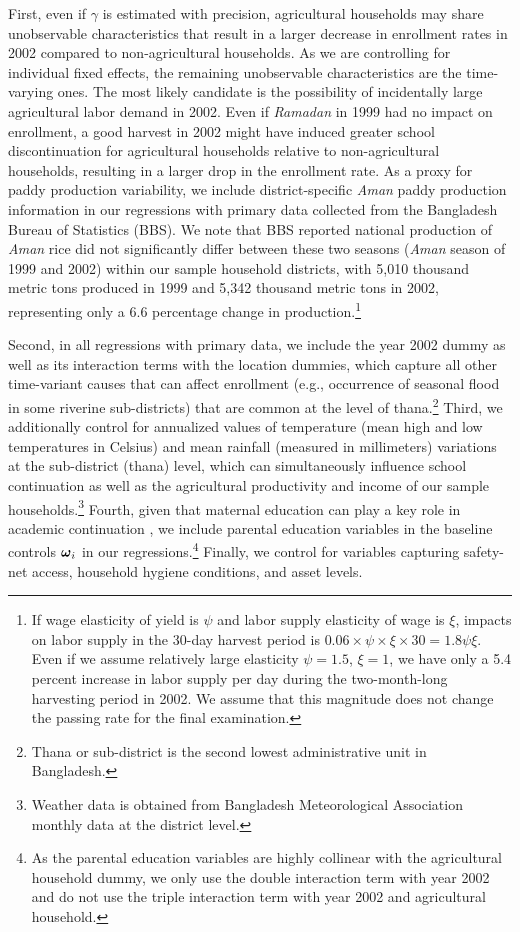 \documentclass[12pt,letterpaper]{article}\usepackage[margin=1in]{geometry}
\newcommand{\bfomega}{\ensuremath{\mbox{\boldmath $\omega$}}}
\newcommand{\0}{\ensuremath{\mbox{\boldmath $0$}}}
\begin{document}
First, even if $\gamma$ is estimated with precision, agricultural households may share unobservable characteristics that result in a larger decrease in enrollment rates in 2002 compared to non-agricultural households. As we are controlling for individual fixed effects, the remaining unobservable characteristics are the time-varying ones. The most likely candidate is the possibility of incidentally large agricultural labor demand in 2002. Even if \textit{Ramadan} in 1999 had no impact on enrollment, a good harvest in 2002 might have induced greater school discontinuation for agricultural households relative to non-agricultural households, resulting in a larger drop in the enrollment rate. As a proxy for paddy production variability, we include district-specific \textit{Aman} paddy production information in our regressions with primary data collected from the Bangladesh Bureau of Statistics (BBS). We note that BBS reported national production of \textit{Aman} rice did not significantly differ between these two seasons (\textit{Aman} season of 1999 and 2002) within our sample household districts, with 5,010 thousand metric tons produced in 1999 and 5,342 thousand metric tons in 2002, representing only a 6.6 percentage change in production.\footnote{If wage elasticity of yield is $\psi$ and labor supply elasticity of wage is $\xi$, impacts on labor supply in the 30-day harvest period is $0.06\times\psi\times\xi\times 30 = 1.8\psi\xi$. Even if we assume relatively large elasticity $\psi = 1.5$, $\xi=1$, we have only a 5.4 percent increase in labor supply per day during the two-month-long harvesting period in 2002. We assume that this magnitude does not change the passing rate for the final examination. } 

Second, in all regressions with primary data, we include the year 2002 dummy as well as its interaction terms with the location dummies, which capture all other time-variant causes that can affect enrollment (e.g., occurrence of seasonal flood in some riverine sub-districts) that are common at the level of thana.\footnote{Thana or sub-district is the second lowest administrative unit in Bangladesh. } Third, we additionally control for annualized values of temperature (mean high and low temperatures in Celsius) and mean rainfall (measured in millimeters) variations at the sub-district (thana) level, which can simultaneously influence school continuation as well as the agricultural productivity and income of our sample households.\footnote{Weather data is obtained from Bangladesh Meteorological Association monthly data at the district level.} Fourth, given that maternal education can play a key role in academic continuation \citep{BFRV1999}, we include parental education variables in the baseline controls $\bfomega_{i}$ in our regressions.\footnote{As the parental education variables are highly collinear with the agricultural household dummy, we only use the double interaction term with year 2002 and do not use the triple interaction term with year 2002 and agricultural household. } Finally, we control for variables capturing safety-net access, household hygiene conditions, and asset levels.
\end{document}
